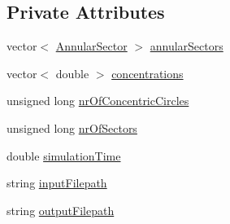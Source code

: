\subsection*{Private Attributes}
\begin{DoxyCompactItemize}
\item 
vector$<$ \hyperlink{classmultiscale_1_1video_1_1AnnularSector}{Annular\-Sector} $>$ \hyperlink{classmultiscale_1_1video_1_1CartesianToPolarConverter_a3f8004ac5f8bae93c7a5e09bc37ba0ac}{annular\-Sectors}
\item 
vector$<$ double $>$ \hyperlink{classmultiscale_1_1video_1_1CartesianToPolarConverter_a7356e201623f518132d75b7bc48407d3}{concentrations}
\item 
unsigned long \hyperlink{classmultiscale_1_1video_1_1CartesianToPolarConverter_ab7c8564deaa38c57a251ba9592903238}{nr\-Of\-Concentric\-Circles}
\item 
unsigned long \hyperlink{classmultiscale_1_1video_1_1CartesianToPolarConverter_a62a2f5abe655f440e7c41fe834f828d0}{nr\-Of\-Sectors}
\item 
double \hyperlink{classmultiscale_1_1video_1_1CartesianToPolarConverter_a78003dc9053d89f56c03408f7f8fedda}{simulation\-Time}
\item 
string \hyperlink{classmultiscale_1_1video_1_1CartesianToPolarConverter_aa15eca9e8d3da0eb8ff1b6583e392f05}{input\-Filepath}
\item 
string \hyperlink{classmultiscale_1_1video_1_1CartesianToPolarConverter_a024d95ab3b9de6ed6fd1d951c5575e65}{output\-Filepath}
\end{DoxyCompactItemize}
